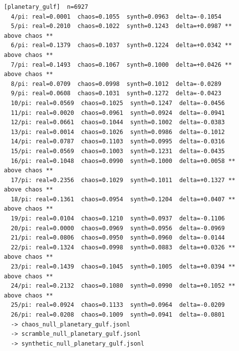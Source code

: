 \documentclass[11pt, letterpaper, openany]{book}
\begin{document}
\begin{empiricalbox}
\begin{lstlisting}[style=terminal]
[planetary_gulf]  n=6927
  4/pi: real=0.0001  chaos=0.1055  synth=0.0963  delta=-0.1054
  5/pi: real=0.2010  chaos=0.1022  synth=0.1243  delta=+0.0987 ** above chaos **
  6/pi: real=0.1379  chaos=0.1037  synth=0.1224  delta=+0.0342 ** above chaos **
  7/pi: real=0.1493  chaos=0.1067  synth=0.1000  delta=+0.0426 ** above chaos **
  8/pi: real=0.0709  chaos=0.0998  synth=0.1012  delta=-0.0289
  9/pi: real=0.0608  chaos=0.1031  synth=0.1272  delta=-0.0423
  10/pi: real=0.0569  chaos=0.1025  synth=0.1247  delta=-0.0456
  11/pi: real=0.0020  chaos=0.0961  synth=0.0924  delta=-0.0941
  12/pi: real=0.0661  chaos=0.1044  synth=0.1002  delta=-0.0383
  13/pi: real=0.0014  chaos=0.1026  synth=0.0986  delta=-0.1012
  14/pi: real=0.0787  chaos=0.1103  synth=0.0995  delta=-0.0316
  15/pi: real=0.0569  chaos=0.1003  synth=0.1231  delta=-0.0435
  16/pi: real=0.1048  chaos=0.0990  synth=0.1000  delta=+0.0058 ** above chaos **
  17/pi: real=0.2356  chaos=0.1029  synth=0.1011  delta=+0.1327 ** above chaos **
  18/pi: real=0.1361  chaos=0.0954  synth=0.1204  delta=+0.0407 ** above chaos **
  19/pi: real=0.0104  chaos=0.1210  synth=0.0937  delta=-0.1106
  20/pi: real=0.0000  chaos=0.0969  synth=0.0956  delta=-0.0969
  21/pi: real=0.0806  chaos=0.0950  synth=0.0960  delta=-0.0144
  22/pi: real=0.1324  chaos=0.0998  synth=0.0883  delta=+0.0326 ** above chaos **
  23/pi: real=0.1439  chaos=0.1045  synth=0.1005  delta=+0.0394 ** above chaos **
  24/pi: real=0.2132  chaos=0.1080  synth=0.0990  delta=+0.1052 ** above chaos **
  25/pi: real=0.0924  chaos=0.1133  synth=0.0964  delta=-0.0209
  26/pi: real=0.0208  chaos=0.1009  synth=0.0941  delta=-0.0801
  -> chaos_null_planetary_gulf.jsonl
  -> scramble_null_planetary_gulf.jsonl
  -> synthetic_null_planetary_gulf.jsonl


\end{lstlisting}
\end{empiricalbox}
\end{document}
